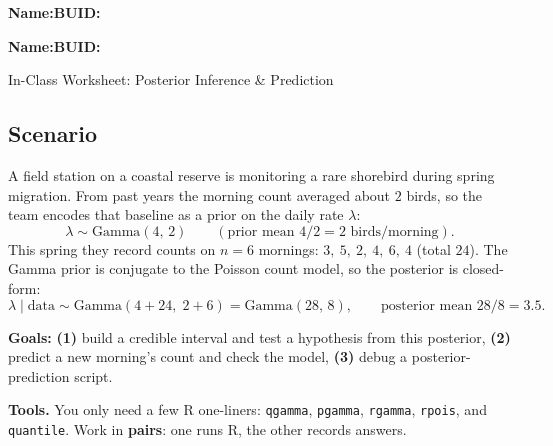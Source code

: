 \documentclass{article}
\newcommand{\blankline}[1]{\underline{\hspace{#1}}}
\begin{document}
\noindent\textbf{Name:}\blankline{2.25in}\hfill\textbf{BUID:}\blankline{1.55in}

\medskip

\noindent\textbf{Name:}\blankline{2.25in}\hfill\textbf{BUID:}\blankline{1.55in}\newline

\begin{center}
 \Large In-Class Worksheet: Posterior Inference \& Prediction
\end{center}

\subsection*{Scenario}
A field station on a coastal reserve is monitoring a rare shorebird during spring migration. From past years the morning count averaged about $2$ birds, so the team encodes that baseline as a prior on the daily rate $\lambda$:
\[
\lambda \sim \text{Gamma}(4,\,2) \qquad (\text{prior mean } 4/2 = 2 \text{ birds/morning}).
\]
This spring they record counts on $n = 6$ mornings: $3,\ 5,\ 2,\ 4,\ 6,\ 4$ (total $24$). The Gamma prior is conjugate to the Poisson count model, so the posterior is closed-form:
\[
\lambda \mid \text{data} \sim \text{Gamma}\!\left(4 + 24,\; 2 + 6\right) = \text{Gamma}(28,\, 8), \qquad \text{posterior mean } 28/8 = 3.5.
\]

\medskip
\noindent\textbf{Goals:}
\textbf{(1)} build a credible interval and test a hypothesis from this posterior,
\textbf{(2)} predict a new morning's count and check the model,
\textbf{(3)} debug a posterior-prediction script.

\medskip
\noindent\textbf{Tools.} You only need a few R one-liners: \texttt{qgamma}, \texttt{pgamma}, \texttt{rgamma}, \texttt{rpois}, and \texttt{quantile}. Work in \textbf{pairs}: one runs R, the other records answers.
\end{document}
